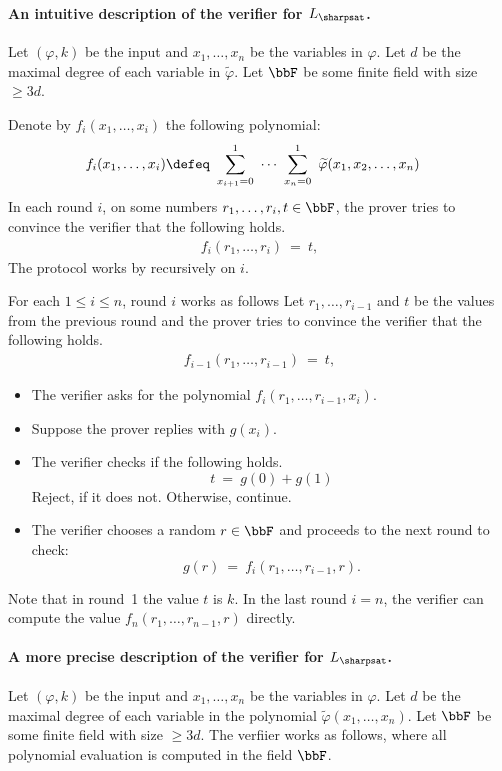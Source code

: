 \documentclass[11pt, a4paper]{article}
\begin{document}
\paragraph*{An intuitive description of the verifier for $L_{\sharpsat}$.}
Let $(\varphi,k)$ be the input and $x_1,\ldots,x_n$ be the variables in $\varphi$.
Let $d$ be the maximal degree of each variable in $\widetilde{\varphi}$.
Let $\bbF$ be some finite field with size $\geq 3d$.

Denote by $f_i(x_1,\ldots,x_i)$ the following polynomial:
\begin{align*}
f_i(x_1,\ldots,x_i) & \defeq\ \sum_{x_{i+1}=0}^1\ \cdots\ \sum_{x_n=0}^1 \ \widetilde{\varphi}(x_1,x_2,\ldots,x_n)
\end{align*}
In each round $i$, on some numbers $r_1,\ldots,r_i,t \in \bbF$,
the prover tries to convince the verifier that the following holds.
\begin{align}
\label{eq:sharpsat-induction}
f_i(r_1,\ldots,r_i) \ = \ t,
\end{align}
The protocol works by recursively on $i$.

For each $1\leq i\leq n$, round $i$ works as follows
Let $r_1,\ldots,r_{i-1}$ and $t$ be the values from the previous round
and the prover tries to convince the verifier that the following holds.
\begin{align}
\label{eq:sharpsat-induction-b}
f_{i-1}(r_1,\ldots,r_{i-1}) \ = \ t,
\end{align}
\begin{itemize}
\item 
The verifier asks for the polynomial $f_{i}(r_1,\ldots,r_{i-1},x_{i})$.

\item 
Suppose the prover replies with $g(x_{i})$.

\item 
The verifier checks if the following holds.
$$
t \ = \ g(0) + g(1)
$$
Reject, if it does not. Otherwise, continue.

\item 
The verifier chooses a random $r\in \bbF$ and proceeds to the next round to check:
$$
g(r) \ = \
f_{i}(r_1,\ldots,r_{i-1},r).
$$
\end{itemize}
Note that in round~1 the value $t$ is $k$.
In the last round $i=n$,
the verifier can compute the value $f_{n}(r_1,\ldots,r_{n-1},r)$ directly.





\paragraph*{A more precise description of the verifier for $L_{\sharpsat}$.}
Let $(\varphi,k)$ be the input and $x_1,\ldots,x_n$ be the variables in $\varphi$.
Let $d$ be the maximal degree of each variable in the polynomial $\widetilde{\varphi}(x_1,\ldots,x_n)$.
Let $\bbF$ be some finite field with size $\geq 3d$.
The verfiier works as follows, where all polynomial evaluation is computed in the field $\bbF$.
\end{document}
